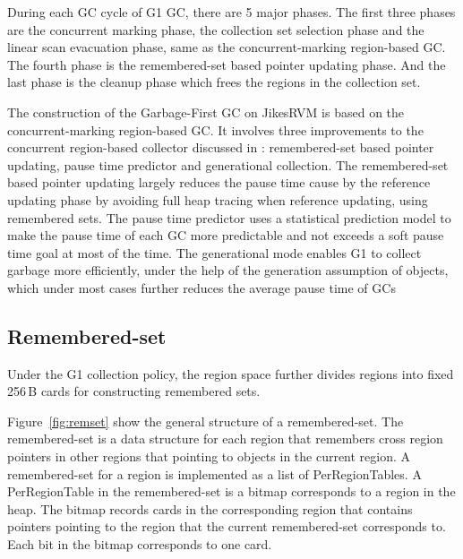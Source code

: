 During each GC cycle of G1 GC, there are 5 major phases.
The first three phases are the concurrent marking phase, the collection
set selection phase and the linear scan evacuation phase,
same as the concurrent-marking region-based GC.
The fourth phase is the remembered-set based pointer updating phase.
And the last phase is the cleanup phase which frees the regions in the collection set.

The construction of the Garbage-First GC on JikesRVM is based on the concurrent-marking
region-based GC.
It involves three improvements to the concurrent region-based collector discussed in \label{sec:concmarkgc}:
remembered-set based pointer updating, pause time predictor and generational collection.
The remembered-set based pointer updating largely reduces the pause time cause by
the reference updating phase by avoiding full heap tracing when reference updating,
using remembered sets. The pause time predictor uses a statistical prediction model to make the pause time of each
GC more predictable and not exceeds a soft pause time goal at most of the time.
The generational mode enables G1 to collect garbage more efficiently, under the help
of the generation assumption of objects, which under most cases
further reduces the average pause  time of GCs

\subsection{Remembered-set}

Under the G1 collection policy, the region space further divides regions into fixed 256\,B cards for constructing remembered sets.

Figure~\ref{fig:remset} show the general structure of a remembered-set. The remembered-set is a data structure for each region that remembers cross
region pointers in other regions that pointing to objects in the current region.
A remembered-set for a region is implemented as a list of PerRegionTables.
A PerRegionTable in the remembered-set is a bitmap corresponds to a region in the heap.
The bitmap records cards in the corresponding region that contains pointers pointing to the
region that the current remembered-set corresponds to. Each bit in the bitmap corresponds to one card.

\begin{figure*}
  \centering
  \texttt{[image: \{figs/remset.png]}}
  \caption{Remembered-Set Structure}
  \label{fig:remset}
\end{figure*}

